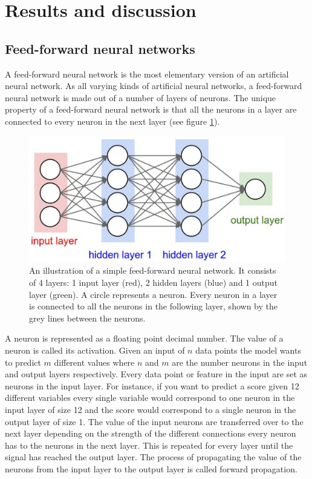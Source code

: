 \documentclass[a4paper,11pt,twoside]{article}
\begin{document}
\newpage
\section{Results and discussion}

\subsection{Feed-forward neural networks}
A feed-forward neural network is the most elementary version of an artificial neural network. As all varying kinds of artificial neural networks, a feed-forward neural network is made out of a number of layers of neurons. The unique property of a feed-forward neural network is that all the neurons in a layer are connected to every neuron in the next layer (see figure \ref{figfeedforward}). \cite{cs231n}

\begin{figure}[h]
	\centering
  		\includegraphics[scale=1]{feedforward.png}
  	\caption{An illustration of a simple feed-forward neural network. It consists of 4 layers: 1 input layer (red), 2 hidden layers (blue) and 1 output layer (green). A circle represents a neuron. Every neuron in a layer is connected to all the neurons in the following layer, shown by the grey lines between the neurons. \cite{hidden12}} \label{figfeedforward}
\end{figure}

A neuron is represented as a floating point decimal number. The value of a neuron is called its activation. Given an input of $n$ data points the model wants to predict $m$ different values where $n$ and $m$ are the number neurons in the input and output layers respectively. Every data point or feature in the input are set as neurons in the input layer. For instance, if you want to predict a score given 12 different variables every single variable would correspond to one neuron in the input layer of size 12 and the score would correspond to a single neuron in the output layer of size 1. The value of the input neurons are transferred over to the next layer depending on the strength of the different connections every neuron has to the neurons in the next layer. This is repeated for every layer until the signal has reached the output layer. The process of propagating the value of the neurons from the input layer to the output layer is called forward propagation. \cite{cs231n}
\end{document}
